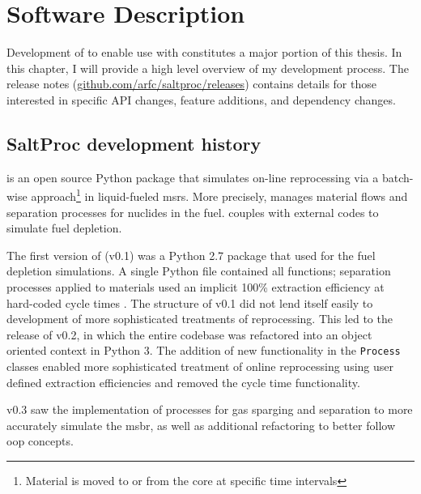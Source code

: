 \chapter{Software Description}
Development of \SaltProc to enable use with \OpenMC constitutes a major portion
of this thesis. In this chapter, I will provide a high level overview
of my development process. The release
notes (\url{github.com/arfc/saltproc/releases}) contains
details for those interested in specific API changes, feature additions,
and dependency changes. 

\section{SaltProc development history}%
\label{sec:saltproc-history}

\SaltProc\cite{rykhlevskii_saltproc_2018} is an open source Python package that
simulates on-line reprocessing via a batch-wise approach\footnote{Material is
moved to or from the core at specific time intervals} in liquid-fueled
\Gls{msr}s. More precisely, \SaltProc manages material flows and separation
processes for nuclides in the fuel. \SaltProc couples with external codes to simulate
fuel depletion.

The first version of \SaltProc (v0.1) was a Python 2.7 package that used
\SerpentTWO for the fuel depletion simulations. A single Python file contained
all functions; separation processes applied to materials used an implicit 100\%
extraction efficiency at hard-coded cycle times \cite{rykhlevskii_advanced_2018}.
The structure of \SaltProc v0.1 did not lend itself easily to development of more
sophisticated treatments of reprocessing. This led to the release of \SaltProc
v0.2, in which the entire codebase was refactored into an object oriented
context in Python 3. The addition of new functionality in the \verb.Process.
classes enabled more sophisticated treatment of online reprocessing using user
defined extraction efficiencies and removed the cycle time functionality\cite{rykhlevskii_fuel_2020}.

\SaltProc v0.3 saw the implementation of processes for gas sparging and
separation to more accurately simulate the \gls{msbr}, as well as additional
refactoring to better follow \Gls{oop} concepts.

